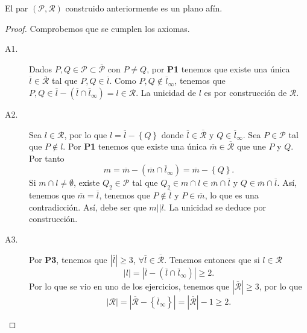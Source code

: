 \begin{theorem}
El par $\displaystyle \left(\mathcal{P}, \mathcal{R}\right) $ construido anteriormente es un plano afín. 
\end{theorem}
\begin{proof}
Comprobemos que se cumplen los axiomas.
\begin{description}
\item[A1.] Dados $\displaystyle P, Q \in \mathcal{P} \subset \overline{\mathcal{P}}$ con $\displaystyle P \neq Q $, por \textbf{P1} tenemos que existe una única $\displaystyle \overline{l} \in \overline{\mathcal{R}} $ tal que $\displaystyle P, Q \in \overline{l} $. Como $\displaystyle P,Q \not\in \overline{l}_{\infty} $, tenemos que $\displaystyle P,Q \in \overline{l}- \left(\overline{l} \cap \overline{l}_{\infty}\right) = l \in \mathcal{R}$. La unicidad de $\displaystyle l $ es por construcción de $\displaystyle \mathcal{R} $.
\item[A2.] Sea $\displaystyle l \in \mathcal{R} $, por lo que $\displaystyle l = \overline{l} - \left\{ Q\right\}  $ donde $\displaystyle \overline{l} \in \overline{\mathcal{R}} $ y $\displaystyle Q \in \overline{l}_{\infty} $. Sea $\displaystyle P \in \mathcal{P} $ tal que $\displaystyle P \not\in l $.
	Por \textbf{P1} tenemos que existe una única $\displaystyle \overline{m} \in \overline{\mathcal{R}} $ que une $\displaystyle P $ y $\displaystyle Q $. Por tanto
	\[ m = \overline{m} - \left(\overline{m} \cap \overline{l}_{\infty}\right) = \overline{m} - \left\{ Q\right\}  .\]
Si $\displaystyle m \cap l \neq \emptyset $, existe $\displaystyle Q_{2} \in \mathcal{P} $ tal que $\displaystyle Q_{2} \in m \cap l \in \overline{m} \cap \overline{l} $ y $\displaystyle Q \in \overline{m} \cap \overline{l} $. Así, tenemos que $\displaystyle \overline{m} = \overline{l} $, tenemos que $\displaystyle P \not\in \overline{l} $ y $\displaystyle P \in \overline{m} $, lo que es una contradicción. Así, debe ser que $\displaystyle m | | l $. La unicidad se deduce por construcción.
\item[A3.] Por \textbf{P3}, tenemos que $\displaystyle \left|\overline{l}\right| \geq 3 $, $\displaystyle \forall \overline{l} \in \overline{\mathcal{R}} $. Tenemos entonces que si $\displaystyle l \in \mathcal{R} $ 
	\[ \left|l \right| = \left|\overline{l} - \left(\overline{l} \cap \overline{l}_{\infty}\right)\right| \geq 2  .\]
Por lo que se vio en uno de los ejercicios, tenemos que $\displaystyle \left|\overline{\mathcal{R}}\right| \geq 3 $, por lo que
\[ \left|\mathcal{R}\right| = \left|\overline{\mathcal{R}} - \left\{ \overline{l}_{\infty}\right\} \right| = \left|\overline{\mathcal{R}}\right| - 1 \geq 2 .\]
\end{description}
\end{proof}

